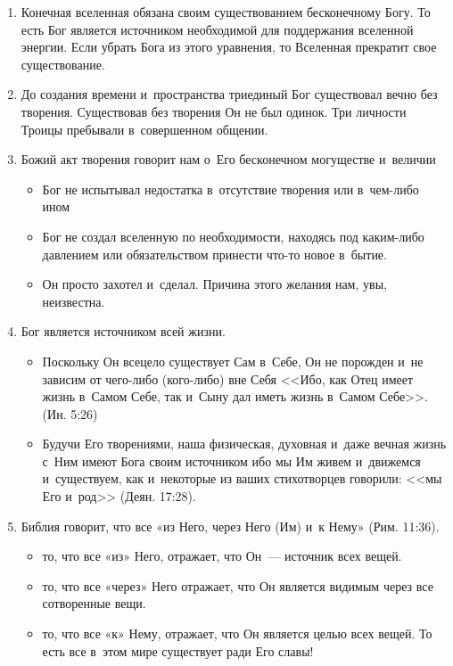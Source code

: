 \documentclass[a4paper,12pt]{article}
\begin{document}
\begin{enumerate}    

    \item Конечная вселенная обязана своим существованием бесконечному Богу. То есть Бог является источником необходимой для поддержания вселенной энергии. Если убрать Бога из этого уравнения, то Вселенная прекратит свое существование.
    \item До создания времени и~пространства триединый Бог существовал вечно без творения. Существовав без творения Он не был одинок. Три личности Троицы пребывали в~совершенном общении.
    \item Божий акт творения говорит нам о~Его бесконечном могуществе и~величии
    \begin{itemize}
        \item Бог не испытывал недостатка в~отсутствие творения или в~чем-либо ином
        \item Бог не создал вселенную по необходимости, находясь под каким-либо давлением или обязательством принести что-то новое в~бытие.
        \item Он просто захотел и~сделал. Причина этого желания нам, увы, неизвестна.
    \end{itemize}

    \item Бог является источником всей жизни.
    
    \begin{itemize}
        \item Поскольку Он всецело существует Сам в~Себе, Он не порожден и~не зависим от чего-либо (кого-либо) вне Себя <<Ибо, как Отец имеет жизнь в~Самом Себе, так и~Сыну дал иметь жизнь в~Самом Себе>>. (Ин. 5:26)
        \item Будучи Его творениями, наша физическая, духовная и~даже вечная жизнь с~Ним имеют Бога своим источником ибо мы Им живем и~движемся и~существуем, как и~некоторые из ваших стихотворцев говорили: <<мы Его и~род>> (Деян. 17:28).
    \end{itemize}

    \item Библия говорит, что все «из Него, через Него (Им) и~к Нему» (Рим. 11:36).
    
    \begin{itemize}
        \item то, что все «из» Него, отражает, что Он~--- источник всех вещей.
        \item то, что все «через» Него отражает, что Он является видимым через все сотворенные вещи.
        \item то, что все «к» Нему, отражает, что Он является целью всех вещей. То есть все в~этом мире существует ради Его славы!
    \end{itemize}
\end{enumerate}
\end{document}
